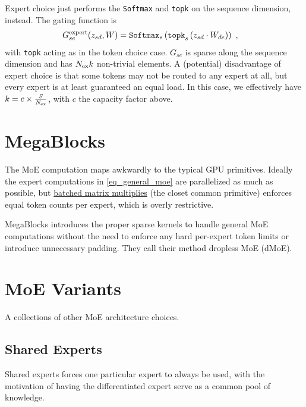 Expert choice just performs the \texttt{Softmax} and \texttt{topk} on the sequence dimension,
instead.  The gating function is
\begin{align}
    G  ^{ {\rm  expert} }_{ se }(z _{ sd }, W)  &= \texttt{Softmax}_{ s } \left ( \texttt{topk} _{ s } \left ( z _{ sd } \cdot W _{ de }  \right ) \right ) \ , \label{eq_expert_choice}
\end{align}
with \texttt{topk} acting as in the token choice case. $G _{ se } $ is sparse along the sequence
dimension and has $ N _{ {\rm ex} }k $ non-trivial elements. A (potential) disadvantage of expert
choice is that some tokens may not be routed to any expert at all, but every expert is at least
guaranteed an equal load. In this case, we effectively have $ k = c \times  \frac{ S }{ N _{ {\rm
ex} } } $, with $ c $ the capacity factor above.


\section{MegaBlocks}

The MoE computation maps awkwardly to the typical GPU primitives. Ideally the expert computations in
\eqref{eq_general_moe} are parallelized as much as possible, but
\href{https://pytorch.org/docs/stable/generated/torch.bmm.html}{batched matrix multiplies} (the
closet common primitive) enforces equal token counts per expert, which is overly restrictive.

MegaBlocks \cite{gale2022megablocksefficientsparsetraining} introduces the proper sparse kernels to
handle general MoE computations without the need to enforce any hard per-expert token limits or
introduce unnecessary padding. They call their method dropless MoE (dMoE).


\section{MoE Variants}

A collections of other MoE architecture choices.

\subsection{Shared Experts}


Shared experts forces one particular expert to always be used, with the motivation of having the
differentiated expert serve as a common pool of knowledge.

